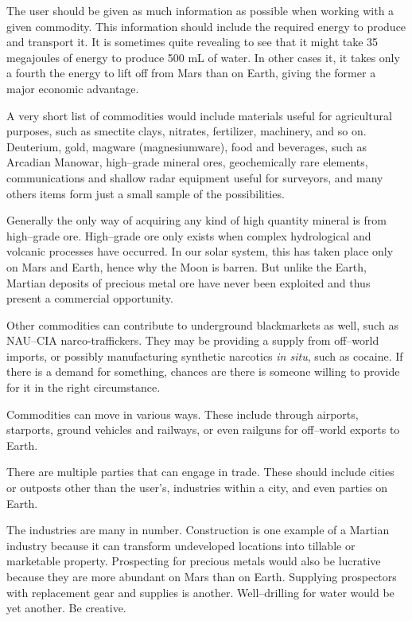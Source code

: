 The user should be given as much information as possible when working with a given commodity. This information should include the required energy to produce and transport it. It is sometimes quite revealing to see that it might take 35 megajoules of energy to produce 500 mL of water. In other cases it, it takes only a fourth the energy to lift off from Mars than on Earth, giving the former a major economic advantage.

A very short list of commodities would include materials useful for agricultural purposes, such as smectite clays, nitrates, fertilizer, machinery, and so on. Deuterium, gold, magware (magnesiumware), food and beverages, such as Arcadian Manowar, high--grade mineral ores, geochemically rare elements, communications and shallow radar equipment useful for surveyors, and many others items form just a small sample of the possibilities.

Generally the only way of acquiring any kind of high quantity mineral is from high--grade ore. High--grade ore only exists when complex hydrological and volcanic processes have occurred. In our solar system, this has taken place only on Mars and Earth, hence why the Moon is barren. But unlike the Earth, Martian deposits of precious metal ore have never been exploited and thus present a commercial opportunity.

Other commodities can contribute to underground blackmarkets as well, such as NAU--CIA narco-traffickers. They may be providing a supply from off--world imports, or possibly manufacturing synthetic narcotics {\it in situ}, such as cocaine. If there is a demand for something, chances are there is someone willing to provide for it in the right circumstance.

Commodities can move in various ways. These include through airports, starports, ground vehicles and railways, or even railguns for off--world exports to Earth.

There are multiple parties that can engage in trade. These should include cities or outposts other than the user's, industries within a city, and even parties on Earth.

The industries are many in number. Construction is one example of a Martian industry because it can transform undeveloped locations into tillable or marketable property. Prospecting for precious metals would also be lucrative because they are more abundant on Mars than on Earth. Supplying prospectors with replacement gear and supplies is another. Well--drilling for water would be yet another. Be creative.

